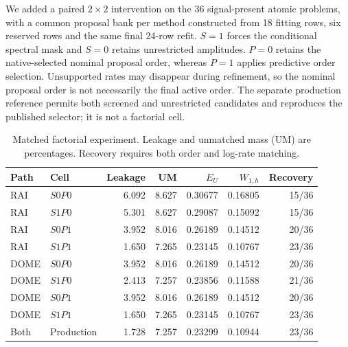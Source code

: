We added a paired $2\times2$ intervention on the 36 signal-present atomic
problems, with a common proposal bank per method constructed from 18 fitting
rows, six reserved rows and the same final 24-row refit. $S=1$ forces the
conditional spectral mask and $S=0$ retains unrestricted amplitudes.
$P=0$ retains the native-selected nominal proposal order, whereas $P=1$
applies predictive order selection. Unsupported rates may disappear during
refinement, so the nominal proposal order is not necessarily the final active
order. The separate production reference permits both screened and unrestricted
candidates and reproduces the published selector; it is not a factorial cell.

\begin{table}[htbp]
\caption{Matched factorial experiment. Leakage and unmatched mass (UM) are
percentages. Recovery requires both order and log-rate matching.}
\label{tab:revision-factorial}
\centering
\begin{tabular}{llrrrrr}
\toprule
Path & Cell & Leakage & UM & $E_U$ & $W_{1,h}$ & Recovery \\
\midrule
RAI & $S0P0$ & 6.092 & 8.627 & 0.30677 & 0.16805 & 15/36 \\
RAI & $S1P0$ & 5.301 & 8.627 & 0.29087 & 0.15092 & 15/36 \\
RAI & $S0P1$ & 3.952 & 8.016 & 0.26189 & 0.14512 & 20/36 \\
RAI & $S1P1$ & 1.650 & 7.265 & 0.23145 & 0.10767 & 23/36 \\
DOME & $S0P0$ & 3.952 & 8.016 & 0.26189 & 0.14512 & 20/36 \\
DOME & $S1P0$ & 2.413 & 7.257 & 0.23856 & 0.11588 & 21/36 \\
DOME & $S0P1$ & 3.952 & 8.016 & 0.26189 & 0.14512 & 20/36 \\
DOME & $S1P1$ & 1.650 & 7.265 & 0.23145 & 0.10767 & 23/36 \\
Both & Production & 1.728 & 7.257 & 0.23299 & 0.10944 & 23/36 \\
\bottomrule
\end{tabular}
\end{table}


